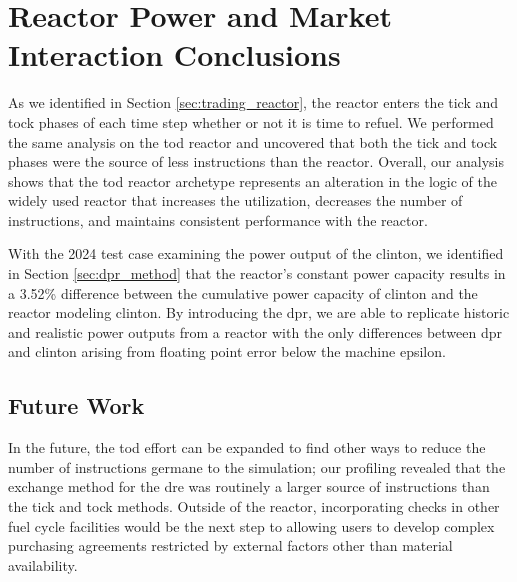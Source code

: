 \section{Reactor Power and Market Interaction Conclusions}

As we identified in Section \ref{sec:trading_reactor}, the \cycamore reactor enters the tick and tock phases of each time step whether or not it is time to refuel. We performed the same analysis on the \gls{tod} reactor and uncovered that both the tick and tock phases were the source of less instructions than the \cycamore reactor. Overall, our analysis shows that the \gls{tod} reactor archetype represents an alteration in the logic of the widely used \cycamore reactor that increases the utilization, decreases the number of instructions, and maintains consistent performance with the \cycamore reactor.

With the 2024 test case examining the power output of the \gls{clinton}, we identified in Section \ref{sec:dpr_method} that the \cycamore reactor's constant power capacity results in a 3.52\% difference between the cumulative power capacity of \gls{clinton} and the \cycamore reactor modeling \gls{clinton}. By introducing the \gls{dpr}, we are able to replicate historic and realistic power outputs from a reactor with the only differences between \gls{dpr} and \gls{clinton} arising from floating point error below the machine epsilon.

\subsection{Future Work}
\label{sec:time_future_work}

In the future, the \gls{tod} effort can be expanded to find other ways to reduce the number of instructions germane to the simulation; our profiling revealed that the exchange method for the \gls{dre} was routinely a larger source of instructions than the tick and tock methods. Outside of the reactor, incorporating checks in other fuel cycle facilities would be the next step to allowing users to develop complex purchasing agreements restricted by external factors other than material availability.

